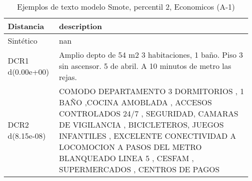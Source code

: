 \begin{table}[H]
\centering
\fontsize{10}{14}\selectfont
\caption{Ejemplos de texto modelo Smote, percentil 2, Economicos (A-1)}
\label{table-example-economicos-a-1-smote-enc-2p-text}
\begin{tabular}{|l|m{35em}|}
\hline
\rowcolor[gray]{0.8}
Distancia & description \\
\hline Sintético & nan \\
\hline DCR1 d(0.00e+00) & Amplio depto de 54 m2 3 habitaciones, 1 ba\~no. Piso 3 sin ascensor.   5 de abril. A 10 minutos de metro las rejas. \\
\hline DCR2 d(8.15e-08) & COMODO DEPARTAMENTO 3 DORMITORIOS , 1 BA\~NO ,COCINA AMOBLADA , ACCESOS CONTROLADOS 24/7 , SEGURIDAD, CAMARAS DE VIGILANCIA , BICICLETEROS, JUEGOS INFANTILES , EXCELENTE CONECTIVIDAD A LOCOMOCION A PASOS DEL METRO BLANQUEADO LINEA 5 , CESFAM , SUPERMERCADOS , CENTROS DE PAGOS \\
\hline
\end{tabular}
\end{table}
